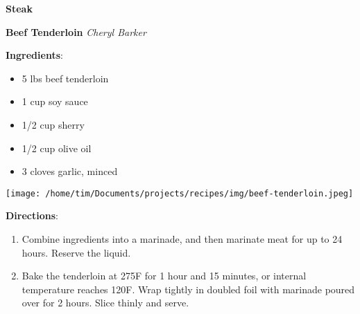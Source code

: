 \documentclass[11pt, twoside, openany]{book}
\begin{document}
{\newpage \LARGE \textbf{Steak}} \label{steak}\vspace{4mm}\\
\noindent\begin{minipage}[t]{\linewidth}%
{\Large\textbf{Beef Tenderloin}} \label{beef-tenderloin}\hfill\textit{Cheryl Barker}\\
\noindent\begin{minipage}[t]{0.78\linewidth}%
\textbf{Ingredients}:\vspace{-3mm}
\begin{multicols}{2}
\begin{itemize}\setlength\itemsep{-1mm}
\item 5 lbs beef tenderloin
\item 1 cup soy sauce
\item 1/2 cup sherry
\item 1/2 cup olive oil
\item 3 cloves garlic, minced
\end{itemize}
\end{multicols}
\end{minipage}
\noindent\begin{minipage}[t]{0.18\linewidth}
\centering \strut\vspace*{-\baselineskip}\newline
\texttt{[image: /home/tim/Documents/projects/recipes/img/beef-tenderloin.jpeg]}\\
\end{minipage}\vspace{3mm}
\textbf{Directions}:
\vspace{-3mm}\begin{enumerate}\setlength\itemsep{-1mm}
\item Combine ingredients into a marinade, and then marinate meat for up to 24 hours. Reserve the liquid.
\item Bake the tenderloin at 275F for 1 hour and 15 minutes, or internal temperature reaches 120F. Wrap tightly in doubled foil with marinade poured over for 2 hours. Slice thinly and serve.
\end{enumerate}
\end{minipage}\vspace{8mm}
\end{document}
